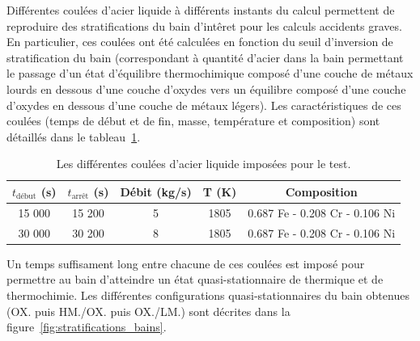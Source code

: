 Différentes coulées d'acier liquide à différents instants du calcul permettent de reproduire des stratifications du bain d'intêret pour les calculs accidents graves. En particulier, ces coulées ont été calculées en fonction du seuil d'inversion de stratification du bain (correspondant à quantité d'acier dans la bain permettant le passage d'un état d'équilibre thermochimique composé d'une couche de métaux lourds en dessous d'une couche d'oxydes vers un équilibre composé d'une couche d'oxydes en dessous d'une couche de métaux légers). Les caractéristiques de ces coulées (temps de début et de fin, masse, température et composition) sont détaillés dans le tableau~\ref{tab:coulees_acier}. 
\begin{table}
	\centering
	\begin{tabular}{ccccc} 
	\hline
	$t_{\text{début}}$ (s) &  $t_{\text{arrêt}}$ (s) & Débit (kg/s) & T (K) & Composition\\
	\hline
	15 000 & 15 200 & 5 & 1805 & 0.687 Fe - 0.208 Cr - 0.106 Ni\\
	30 000 & 30 200 & 8 & 1805 & 0.687 Fe - 0.208 Cr - 0.106 Ni\\
	\hline
	\end{tabular}	
	\caption{Les différentes coulées d'acier liquide imposées pour le test.} 
	\label{tab:coulees_acier}
\end{table}
Un temps suffisament long entre chacune de ces coulées est imposé pour permettre au bain d'atteindre un état quasi-stationnaire de thermique et de thermochimie. Les différentes configurations quasi-stationnaires du bain obtenues (OX. puis HM./OX. puis OX./LM.) sont décrites dans la figure~\ref{fig:stratifications_bains}.
